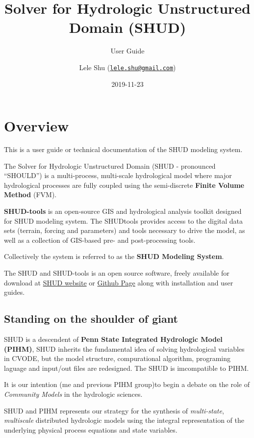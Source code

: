 \documentclass[]{scrbook}
\title{Solver for Hydrologic Unstructured Domain (SHUD)}
\subtitle{User Guide}
\author{Lele Shu
(\href{mailto:lele.shu@gmail.com}{\nolinkurl{lele.shu@gmail.com}})}
\date{2019-11-23}
\begin{document}
\maketitle

{
\setcounter{tocdepth}{1}
\tableofcontents
}
\chapter{Overview}\label{Overview}

This is a user guide or technical documentation of the SHUD modeling
system.

The Solver for Hydrologic Unstructured Domain (SHUD - pronounced
``SHOULD'') is a multi-process, multi-scale hydrological model where
major hydrological processes are fully coupled using the semi-discrete
\textbf{Finite Volume Method} (FVM).

\textbf{SHUD-tools} is an open-source GIS and hydrological analysis
toolkit designed for SHUD modeling system. The SHUDtools provides access
to the digital data sets (terrain, forcing and parameters) and tools
necessary to drive the model, as well as a collection of GIS-based pre-
and post-processing tools.

Collectively the system is referred to as the \textbf{SHUD Modeling
System}.

The SHUD and SHUD-tools is an open source software, freely available for
download at \href{https://SHUD-system.github.io}{SHUD website} or
\href{https://github.com/SHUD-System/}{Github Page} along with
installation and user guides.

\section{Standing on the shoulder of
giant}\label{standing-on-the-shoulder-of-giant}

SHUD is a descendent of \textbf{Penn State Integrated Hydrologic Model
(PIHM)}, SHUD inherits the fundamental idea of solving hydrological
variables in CVODE, but the model structure, compurational algorithm,
programing laguage and input/out files are redesigned. The SHUD is
imcompatible to PIHM.

It is our intention (me and previous PIHM group)to begin a debate on the
role of \emph{Community Models} in the hydrologic sciences.

SHUD and PIHM represents our strategy for the synthesis of
\emph{multi-state}, \emph{multiscale} distributed hydrologic models
using the integral representation of the underlying physical process
equations and state variables.
\end{document}
